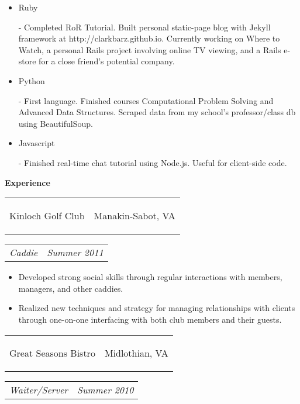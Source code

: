 \documentclass[11pt]{article}
\makeatletter
\newcommand{\headerrow}[2]
{\begin{tabular*}{\linewidth}{l@{\extracolsep{\fill}}r}
	#1 &
	#2 \\
\end{tabular*}}
\makeatother
\begin{document}
\begin{itemize}
	\item \begin{bf}Ruby\end{bf} - Completed RoR Tutorial. Built personal static-page blog with Jekyll framework at http://clarkbarz.github.io. Currently working on Where to Watch, a personal Rails project involving online TV viewing, and a Rails e-store for a close friend's potential company.
	\vspace{-0.5em}
	\item \begin{bf}Python\end{bf} - First language. Finished courses Computational Problem Solving and Advanced Data Structures. Scraped data from my school's professor/class db using BeautifulSoup.
	\vspace{-0.5em}
	\item \begin{bf}Javascript\end{bf} - Finished real-time chat tutorial using Node.js. Useful for client-side code.
\end{itemize}

\vspace{-0.5em}
\begin{LARGE}
	\bf Experience
\end{LARGE}

\vspace{0.5em}

\headerrow
	{\begin{Large}Kinloch Golf Club\end{Large}}
	{Manakin-Sabot, VA}
\headerrow
	{\textit{Caddie}}
	{\textit{Summer 2011}}
	
\vspace{-0.8em}
\begin{itemize}
	\item Developed strong social skills through regular interactions with members, managers, and other caddies.
	\vspace{-0.5em}
	\item Realized new techniques and strategy for managing relationships with clients through one-on-one interfacing with both club members and their guests. 
\end{itemize}

\vspace{-0.5em}

\headerrow
	{\begin{Large}Great Seasons Bistro\end{Large}}
	{Midlothian, VA}
\headerrow
	{\textit{Waiter/Server}}
	{\textit{Summer 2010}}
	
\end{document}
